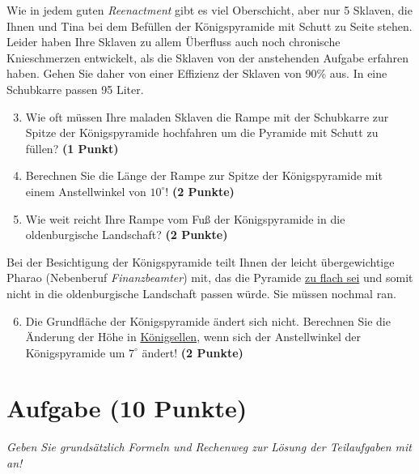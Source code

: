 \documentclass[a4paper, 9pt]{scrartcl}\usepackage[]{graphicx}\usepackage[]{xcolor}
\begin{document}
Wie in jedem guten \textit{Reenactment} gibt es viel Oberschicht, aber nur 5 Sklaven, die Ihnen und Tina bei dem Befüllen der Königspyramide mit Schutt zu Seite stehen. Leider haben Ihre Sklaven zu allem Überfluss auch noch chronische Knieschmerzen entwickelt, als die Sklaven von der anstehenden Aufgabe erfahren haben. Gehen Sie daher von einer Effizienz der Sklaven von 90\% aus. In eine Schubkarre passen 95 Liter.

\begin{enumerate}
  \setcounter{enumi}{2}
\item Wie oft müssen Ihre maladen Sklaven die Rampe mit der Schubkarre zur Spitze der Königspyramide hochfahren um die Pyramide mit Schutt zu füllen? \textbf{(1 Punkt)}
\item Berechnen Sie die Länge der Rampe zur Spitze der Königspyramide mit einem Anstellwinkel von $10^\circ$! \textbf{(2 Punkte)}
\item Wie weit reicht Ihre Rampe vom Fuß der Königspyramide in die oldenburgische Landschaft?  \textbf{(2 Punkte)}
\end{enumerate}

Bei der Besichtigung der Königspyramide teilt Ihnen der leicht übergewichtige Pharao (Nebenberuf \textit{Finanzbeamter}) mit, das die Pyramide \underline{zu flach sei} und somit nicht in die oldenburgische Landschaft passen würde. Sie müssen nochmal ran.

\begin{enumerate}
  \setcounter{enumi}{5}
\item Die Grundfläche der Königspyramide ändert sich nicht. Berechnen Sie die Änderung der Höhe in \underline{Königsellen}, wenn sich der Anstellwinkel der Königspyramide um $7^\circ$ ändert!  \textbf{(2 Punkte)}
\end{enumerate}



\clearpage

\section{Aufgabe \hfill (10 Punkte)}

\textit{Geben Sie grundsätzlich Formeln und Rechenweg zur Lösung der Teilaufgaben mit an!} \\[1Ex]
 
\end{document}
